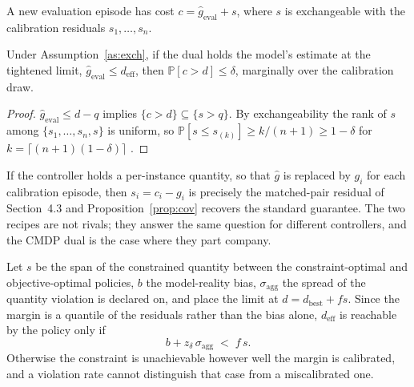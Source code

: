 \begin{assumption}\label{as:exch}
A new evaluation episode has cost $c = \hat g_{\mathrm{eval}} + s$, where $s$
is exchangeable with the calibration residuals $s_1,\dots,s_n$.
\end{assumption}

\begin{proposition}\label{prop:cov}
Under Assumption~\ref{as:exch}, if the dual holds the model's estimate at the
tightened limit, $\hat g_{\mathrm{eval}} \le d_{\mathrm{eff}}$, then
$\mathbb{P}[c > d] \le \delta$, marginally over the calibration draw.
\end{proposition}

\begin{proof}
$\hat g_{\mathrm{eval}} \le d - q$ implies $\{c > d\} \subseteq \{s > q\}$. By
exchangeability the rank of $s$ among $\{s_1,\dots,s_n,s\}$ is uniform, so
$\mathbb{P}[s \le s_{(k)}] \ge k/(n+1) \ge 1-\delta$ for
$k = \lceil (n+1)(1-\delta)\rceil$ \citep{lei2018splitconformal}.
\end{proof}

\begin{remark}
If the controller holds a per-instance quantity, so that $\hat g$ is replaced
by $g_i$ for each calibration episode, then $s_i = c_i - g_i$ is precisely the
matched-pair residual of Section~4.3 and Proposition~\ref{prop:cov} recovers
the standard guarantee. The two recipes are not rivals; they answer the same
question for different controllers, and the CMDP dual is the case where they
part company.
\end{remark}

\begin{proposition}\label{prop:feasible}
Let $s$ be the span of the constrained quantity between the constraint-optimal
and objective-optimal policies, $b$ the model-reality bias,
$\sigma_{\mathrm{agg}}$ the spread of the quantity violation is declared on,
and place the limit at $d = d_{\mathrm{best}} + f s$. Since the margin is a
quantile of the residuals rather than the bias alone, $d_{\mathrm{eff}}$ is
reachable by the policy only if
\begin{equation}
  b + z_\delta\,\sigma_{\mathrm{agg}} \;<\; f\,s .
  \label{eq:feasible}
\end{equation}
Otherwise the constraint is unachievable however well the margin is calibrated,
and a violation rate cannot distinguish that case from a miscalibrated one.
\end{proposition}

